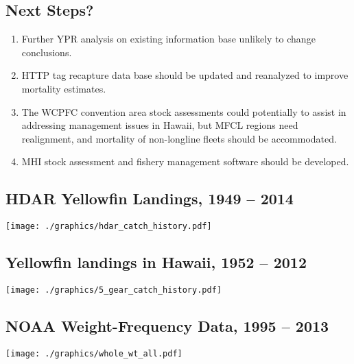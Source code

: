 \documentclass[a4paper,KOMA,landscape,titlepage]{powersem}
\begin{document}
\begin{slide}\section{Next Steps?}
\begin{enumerate}
\item Further YPR analysis on existing information base unlikely to
change conclusions.

\item HTTP tag recapture data base should be updated and reanalyzed to
improve mortality estimates.

\item The WCPFC convention area stock assessments could potentially
to assist in addressing management issues in Hawaii, but 
MFCL regions need realignment, and mortality of non-longline fleets
should be accommodated.

\item MHI stock assessment and fishery management software should be
developed.

\end{enumerate}
\end{slide}


\begin{slide}\section{HDAR Yellowfin Landings, 1949 -- 2014}
\begin{center}
\texttt{[image: ./graphics/hdar\_catch\_history.pdf]}
\end{center}
\end{slide}


\begin{slide}\section{Yellowfin landings in Hawaii, 1952 -- 2012}
\begin{center}
\texttt{[image: ./graphics/5\_gear\_catch\_history.pdf]}
\end{center}
\end{slide}

\begin{slide}\section{NOAA Weight-Frequency Data, 1995 -- 2013}
\begin{center}
\texttt{[image: ./graphics/whole\_wt\_all.pdf]}
\end{center}
\end{slide}
\end{document}
